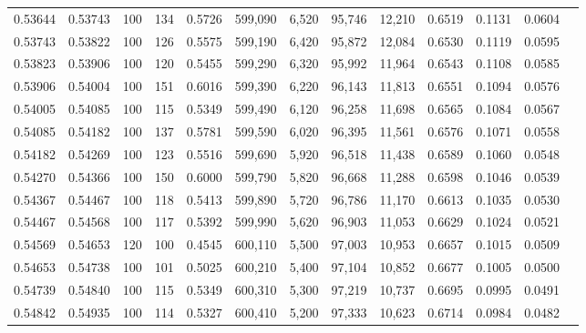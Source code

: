 \begin{tabular}{rrrrrrrrrrrrr}
0.53644 & 0.53743 &    100 & 134 &                                     0.5726 & 599,090 &   6,520 &  95,746 &  12,210 & 0.6519 & 0.1131 & 0.0604 \\
0.53743 & 0.53822 &    100 & 126 &                                     0.5575 & 599,190 &   6,420 &  95,872 &  12,084 & 0.6530 & 0.1119 & 0.0595 \\
0.53823 & 0.53906 &    100 & 120 &                                     0.5455 & 599,290 &   6,320 &  95,992 &  11,964 & 0.6543 & 0.1108 & 0.0585 \\
0.53906 & 0.54004 &    100 & 151 &                                     0.6016 & 599,390 &   6,220 &  96,143 &  11,813 & 0.6551 & 0.1094 & 0.0576 \\
0.54005 & 0.54085 &    100 & 115 &                                     0.5349 & 599,490 &   6,120 &  96,258 &  11,698 & 0.6565 & 0.1084 & 0.0567 \\
0.54085 & 0.54182 &    100 & 137 &                                     0.5781 & 599,590 &   6,020 &  96,395 &  11,561 & 0.6576 & 0.1071 & 0.0558 \\
0.54182 & 0.54269 &    100 & 123 &                                     0.5516 & 599,690 &   5,920 &  96,518 &  11,438 & 0.6589 & 0.1060 & 0.0548 \\
0.54270 & 0.54366 &    100 & 150 &                                     0.6000 & 599,790 &   5,820 &  96,668 &  11,288 & 0.6598 & 0.1046 & 0.0539 \\
0.54367 & 0.54467 &    100 & 118 &                                     0.5413 & 599,890 &   5,720 &  96,786 &  11,170 & 0.6613 & 0.1035 & 0.0530 \\
0.54467 & 0.54568 &    100 & 117 &                                     0.5392 & 599,990 &   5,620 &  96,903 &  11,053 & 0.6629 & 0.1024 & 0.0521 \\
0.54569 & 0.54653 &    120 & 100 &                                     0.4545 & 600,110 &   5,500 &  97,003 &  10,953 & 0.6657 & 0.1015 & 0.0509 \\
0.54653 & 0.54738 &    100 & 101 &                                     0.5025 & 600,210 &   5,400 &  97,104 &  10,852 & 0.6677 & 0.1005 & 0.0500 \\
0.54739 & 0.54840 &    100 & 115 &                                     0.5349 & 600,310 &   5,300 &  97,219 &  10,737 & 0.6695 & 0.0995 & 0.0491 \\
0.54842 & 0.54935 &    100 & 114 &                                     0.5327 & 600,410 &   5,200 &  97,333 &  10,623 & 0.6714 & 0.0984 & 0.0482 \\

\end{tabular}

